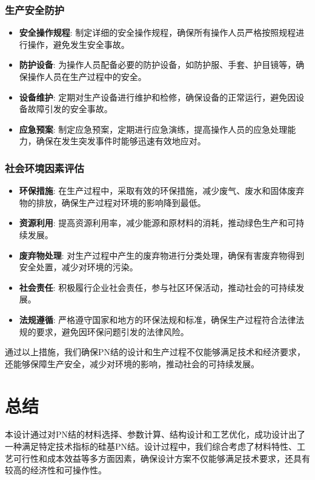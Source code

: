 \documentclass[12pt,hyperref,a4paper,UTF8]{ctexart}
\begin{document}
\subsubsection*{生产安全防护}
\begin{itemize}
    \item \textbf{安全操作规程}: 制定详细的安全操作规程，确保所有操作人员严格按照规程进行操作，避免发生安全事故。
    \item \textbf{防护设备}: 为操作人员配备必要的防护设备，如防护服、手套、护目镜等，确保操作人员在生产过程中的安全。
    \item \textbf{设备维护}: 定期对生产设备进行维护和检修，确保设备的正常运行，避免因设备故障引发的安全事故。
    \item \textbf{应急预案}: 制定应急预案，定期进行应急演练，提高操作人员的应急处理能力，确保在发生突发事件时能够迅速有效地应对。
\end{itemize}

\subsubsection*{社会环境因素评估}
\begin{itemize}
    \item \textbf{环保措施}: 在生产过程中，采取有效的环保措施，减少废气、废水和固体废弃物的排放，确保生产过程对环境的影响降到最低。
    \item \textbf{资源利用}: 提高资源利用率，减少能源和原材料的消耗，推动绿色生产和可持续发展。
    \item \textbf{废弃物处理}: 对生产过程中产生的废弃物进行分类处理，确保有害废弃物得到安全处置，减少对环境的污染。
    \item \textbf{社会责任}: 积极履行企业社会责任，参与社区环保活动，推动社会的可持续发展。
    \item \textbf{法规遵循}: 严格遵守国家和地方的环保法规和标准，确保生产过程符合法律法规的要求，避免因环保问题引发的法律风险。
\end{itemize}

通过以上措施，我们确保PN结的设计和生产过程不仅能够满足技术和经济要求，还能够保障生产安全，减少对环境的影响，推动社会的可持续发展。
\newpage

\section{总结}

本设计通过对PN结的材料选择、参数计算、结构设计和工艺优化，成功设计出了一种满足特定技术指标的硅基PN结。设计过程中，我们综合考虑了材料特性、工艺可行性和成本效益等多方面因素，确保设计方案不仅能够满足技术要求，还具有较高的经济性和可操作性。
\end{document}
